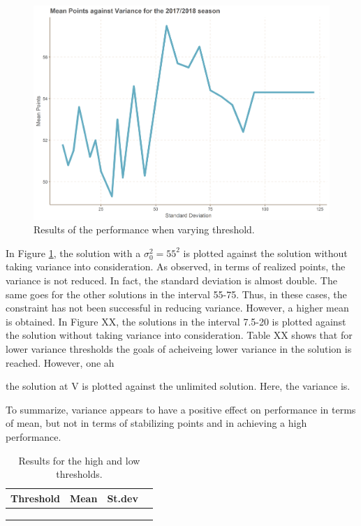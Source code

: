 \begin{figure}[H]
    \centering
    \includegraphics[scale=0.5]{fig/chapter_7/var.png}
    \caption{Results of the performance when varying threshold.}
\label{fig:performance_varying_threshold}    
\end{figure}%


In Figure \ref{fig:performance_varying_threshold}, the solution with a $\sigma_0^{2} = 55^2$ is plotted against the solution without taking variance into consideration. As observed, in terms of realized points, the variance is not reduced. In fact, the standard deviation is almost double. The same goes for the other solutions in the interval 55-75. Thus, in these cases, the constraint has not been successful in reducing variance. However, a higher mean is obtained. In Figure XX, the solutions in the interval 7.5-20 is plotted against the solution without taking variance into consideration. Table XX shows that for lower variance thresholds the goals of acheiveing lower variance in the solution is reached. However, one ah

the solution at V is plotted against the unlimited solution. Here, the variance is. 


To summarize, variance appears to have a positive effect on performance in terms of mean, but not in terms of stabilizing points and in achieving a high performance.


\begin{table}[H]
\centering
\begin{tabular}{@{}llll@{}}
\toprule
 Threshold & Mean & St.dev \\ \midrule
          &      &        \\
          &      &        \\
          &      &        \\ \bottomrule
\end{tabular}
\caption{Results for the high and low thresholds.}
\label{tab_high_low_thresholds}
\end{table}


